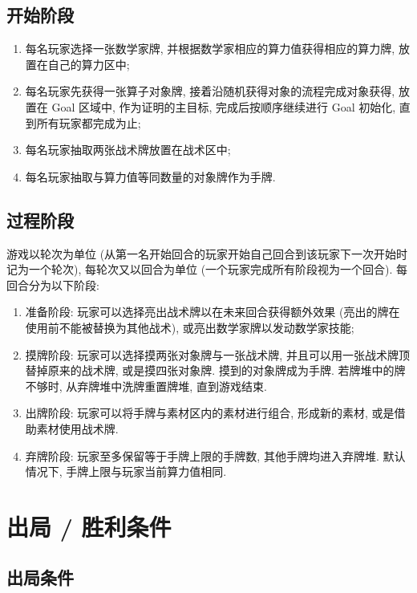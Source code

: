 \documentclass[UTF8]{ctexart}
\DeclareMathOperator{\0}{\mathbf{0}}                    %
\newcommand{\<}{\langle}
\renewcommand{\>}{\rangle}                              %
\theoremstyle{MyStyle} %
\begin{document}
    \subsection{开始阶段}

        \begin{enumerate}
            \item 每名玩家选择一张数学家牌, 并根据数学家相应的算力值获得相应的算力牌, 放置在自己的算力区中; 
            \item 每名玩家先获得一张算子对象牌, 接着沿随机获得对象的流程完成对象获得, 放置在 Goal 区域中, 作为证明的主目标, 完成后按顺序继续进行 Goal 初始化, 直到所有玩家都完成为止; 
            \item 每名玩家抽取两张战术牌放置在战术区中; 
            \item 每名玩家抽取与算力值等同数量的对象牌作为手牌. 
        \end{enumerate}

    \subsection{过程阶段}
        
        游戏以轮次为单位 (从第一名开始回合的玩家开始自己回合到该玩家下一次开始时记为一个轮次), 每轮次又以回合为单位 (一个玩家完成所有阶段视为一个回合). 每回合分为以下阶段: 
        \begin{enumerate}
            \item 准备阶段: 玩家可以选择亮出战术牌以在未来回合获得额外效果 (亮出的牌在使用前不能被替换为其他战术), 或亮出数学家牌以发动数学家技能; 
            \item 摸牌阶段: 玩家可以选择摸两张对象牌与一张战术牌, 并且可以用一张战术牌顶替掉原来的战术牌, 或是摸四张对象牌. 摸到的对象牌成为手牌. 若牌堆中的牌不够时, 从弃牌堆中洗牌重置牌堆, 直到游戏结束. 
            \item 出牌阶段: 玩家可以将手牌与素材区内的素材进行组合, 形成新的素材, 或是借助素材使用战术牌. 
            \item 弃牌阶段: 玩家至多保留等于手牌上限的手牌数, 其他手牌均进入弃牌堆. 默认情况下, 手牌上限与玩家当前算力值相同. 
        \end{enumerate}

    \section{出局 / 胜利条件}
        
    \subsection{出局条件}
        
\end{document}
